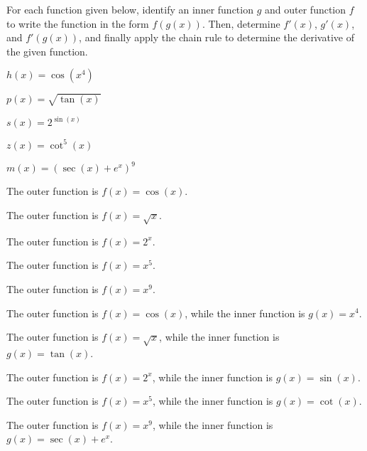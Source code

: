 \begin{activity} \label{A:2.5.1}  
For each function given below, identify an inner function $g$ and outer function $f$ to write the function in the form $f(g(x))$.  Then, determine $f'(x)$, $g'(x)$, and $f'(g(x))$, and finally apply the chain rule to determine the derivative of the given function.  
\ba
	   \item $h(x) = \cos(x^4)$
	   \item  $p(x) = \sqrt{ \tan(x) }$
           \item $s(x) = 2^{\sin(x)}$
           \item $z(x) = \cot^5(x)$
           \item $m(x) = (\sec(x) + e^x)^9$
\ea
\end{activity}
\begin{smallhint}
\ba
	   \item The outer function is $f(x) = \cos(x)$.
	   \item The outer function is $f(x) = \sqrt{x}$.
           \item The outer function is $f(x) = 2^x$.
           \item The outer function is $f(x) = x^5$.
           \item The outer function is $f(x) = x^9$.
\ea
\end{smallhint}
\begin{bighint}
\ba
	   \item The outer function is $f(x) = \cos(x)$, while the inner function is $g(x) = x^4$.
	   \item The outer function is $f(x) = \sqrt{x}$, while the inner function is $g(x) = \tan(x)$.
           \item The outer function is $f(x) = 2^x$, while the inner function is $g(x) = \sin(x)$.
           \item The outer function is $f(x) = x^5$, while the inner function is $g(x) = \cot(x)$.
           \item The outer function is $f(x) = x^9$, while the inner function is $g(x) = \sec(x) + e^x$.
\ea
\end{bighint}
